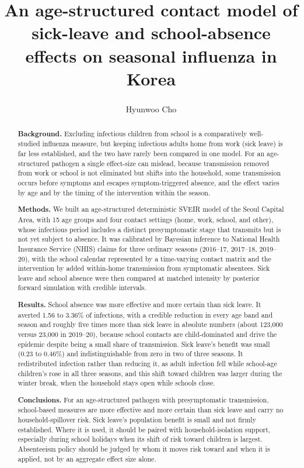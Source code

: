 \documentclass[12pt]{article}
\title{\fontsize{22pt}{26pt}\selectfont
An age-structured contact model of sick-leave and school-absence effects on seasonal influenza in Korea}
\author{Hyunwoo Cho\textsuperscript{}}
\affil[]{}
\date{}
\theoremstyle{plain}
\theoremstyle{remark}
\theoremstyle{definition}
\begin{document}
\maketitle

\begin{abstract}
\noindent\textbf{Background.} Excluding infectious children from school is a comparatively well-studied influenza measure, but keeping infectious adults home from work (sick leave) is far less established, and the two have rarely been compared in one model. For an age-structured pathogen a single effect-size can mislead, because transmission removed from work or school is not eliminated but shifts into the household, some transmission occurs before symptoms and escapes symptom-triggered absence, and the effect varies by age and by the timing of the intervention within the season.

\noindent\textbf{Methods.} We built an age-structured deterministic SVEIR model of the Seoul Capital Area, with 15 age groups and four contact settings (home, work, school, and other), whose infectious period includes a distinct presymptomatic stage that transmits but is not yet subject to absence. It was calibrated by Bayesian inference to National Health Insurance Service (NHIS) claims for three ordinary seasons (2016--17, 2017--18, 2019--20), with the school calendar represented by a time-varying contact matrix and the intervention by added within-home transmission from symptomatic absentees. Sick leave and school absence were then compared at matched intensity by posterior forward simulation with credible intervals.

\noindent\textbf{Results.} School absence was more effective and more certain than sick leave. It averted 1.56 to 3.36\% of infections, with a credible reduction in every age band and season and roughly five times more than sick leave in absolute numbers (about 123{,}000 versus 23{,}000 in 2019--20), because school contacts are child-dominated and drive the epidemic despite being a small share of transmission. Sick leave's benefit was small (0.23 to 0.46\%) and indistinguishable from zero in two of three seasons. It redistributed infection rather than reducing it, as adult infection fell while school-age children's rose in all three seasons, and this shift toward children was larger during the winter break, when the household stays open while schools close.

\noindent\textbf{Conclusions.} For an age-structured pathogen with presymptomatic transmission, school-based measures are more effective and more certain than sick leave and carry no household-spillover risk. Sick leave's population benefit is small and not firmly established. Where it is used, it should be paired with household-isolation support, especially during school holidays when its shift of risk toward children is largest. Absenteeism policy should be judged by whom it moves risk toward and when it is applied, not by an aggregate effect size alone.
\end{abstract}
\end{document}
